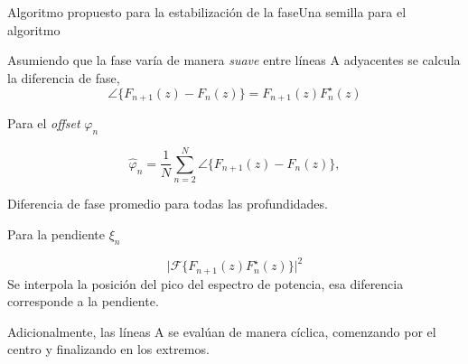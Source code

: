 \documentclass[fleqn,10pt]{beamer}
\begin{document}

\begin{frame}{Algoritmo propuesto para la estabilización de la fase}{Una semilla para el algoritmo}

	Asumiendo que la fase varía de manera \emph{suave} entre líneas A adyacentes se calcula la diferencia de fase, 
	\begin{equation*}
	\angle \{F_{n+1}(z)-F_n(z)\} = F_{n+1}(z)F_n^{\star}(z)
	\end{equation*}
	
	\pause
	\begin{multicols}{2}
		Para el \emph{offset} $\varphi_n$
		
		\begin{equation*}
		\hat{\varphi}_n = \frac{1}{N}\sum_{n=2}^{N}\angle\{ F_{n+1}(z)-F_n(z)\},
		\end{equation*}
		
		Diferencia de fase promedio para todas las profundidades.
		
		\newpage
		\pause
		Para la pendiente $\xi_n$
		
		\begin{equation*}
		\big\lvert \mathscr{F}\{F_{n+1}(z)F_n^{\star}(z) \}\big\rvert^2
		\end{equation*}
		 Se interpola la posición del pico del espectro de potencia, esa diferencia corresponde a la pendiente.
	\end{multicols}
	
	\pause
	Adicionalmente, las líneas A se evalúan de manera cíclica, comenzando por el centro y finalizando en los extremos.
	
\end{frame}

\end{document}
